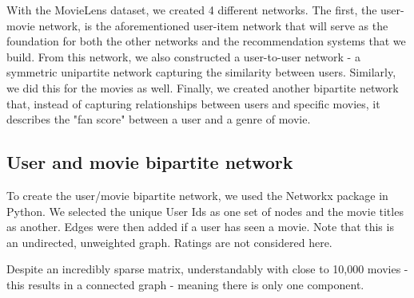 \documentclass[12pt]{article}
\numberwithin{equation}{section}
\begin{document}
With the MovieLens dataset, we created 4 different networks.  The first, the user-movie network, is the aforementioned user-item network that will serve as the foundation for both the other networks and the recommendation systems that we build. From this network, we also constructed a user-to-user network - a symmetric unipartite network capturing the similarity between users. Similarly, we did this for the movies as well. Finally, we created another bipartite network that, instead of capturing relationships between users and specific movies, it describes the "fan score" between a user and a genre of movie.

\subsection{User and movie bipartite network}

To create the user/movie bipartite network, we used the Networkx package in Python. We selected the unique User Ids as one set of nodes and the movie titles as another. Edges were then added if a user has seen a movie. Note that this is an undirected, unweighted graph. Ratings are not considered here.

Despite an incredibly sparse matrix, understandably with close to 10,000 movies - this results in a connected graph - meaning there is only one component.
\end{document}
